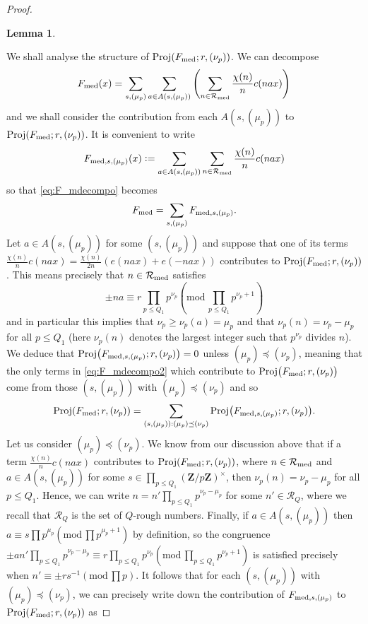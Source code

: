 \documentclass[11pt, reqno]{amsart}
\newtheorem{lemma}[theorem]{Lemma}
\newcommand{\md}[1]{\ensuremath{(\mbox{mod}\, #1)}}
\DeclareMathOperator{\Proj}{Proj}
\begin{document}
\begin{proof}
\begin{lemma}
    \end{lemma}
    We shall analyse the structure of $\Proj(F_\textnormal{med};r,(\nu_p))$. We can decompose
    \begin{equation}\label{eq:F_mdecompo}F_\textnormal{med}(x)=\sum_{s,(\mu_p)}\sum_{a\in A(s,(\mu_p))}\left(\sum_{n\in\mathcal{R}_\textnormal{med}}\frac{\chi(n)}{n}c( nax)\right)
    \end{equation}
    and we shall consider the contribution from each $A(s,(\mu_p))$ to $\Proj(F_\textnormal{med};r,(\nu_p))$. It is convenient to write
    $$F_{\textnormal{med},s,(\mu_p)}(x)\vcentcolon=\sum_{a\in A(s,(\mu_p))}\sum_{n\in \mathcal{R}_\textnormal{med}}\frac{\chi(n)}{n}c( nax)$$
    so that \eqref{eq:F_mdecompo} becomes
    \begin{equation}\label{eq:F_mdecompo2}
        F_\textnormal{med}=\sum_{s,(\mu_p)}F_{\textnormal{med},s,(\mu_p)}.
    \end{equation}
    Let $a\in A(s,(\mu_p))$ for some $(s,(\mu_p))$ and suppose that one of its terms $\frac{\chi(n)}{n}c( nax)=\frac{\chi(n)}{2n}(e(nax)+e(-nax))$ contributes to $\Proj(F_\textnormal{med};r,(\nu_p))$. This means precisely that $n\in\mathcal{R}_\textnormal{med}$ satisfies $$\pm na\equiv r\prod_{p\leqslant Q_1} p^{\nu_p}\md{\prod_{p\leqslant Q_1} p^{\nu_p+1}}$$ and in particular this implies that $\nu_p\geqslant \nu_p(a)=\mu_p$ and that $\nu_p(n)=\nu_p-\mu_p$ for all $p\leqslant Q_1$ (here $\nu_p(n)$ denotes the largest integer such that $p^{\nu_p}$ divides $n$). We deduce that $\Proj\bigl(F_{\textnormal{med},s,(\mu_p)};r,(\nu_p)\bigr)=0$ unless $(\mu_p)\preceq (\nu_p)$, meaning that the only terms in \eqref{eq:F_mdecompo2} which contribute to $\Proj\bigl(F_\textnormal{med};r,(\nu_p)\bigr)$ come from those $(s,(\mu_p))$ with $(\mu_p)\preceq (\nu_p)$ and so
    \begin{align}\label{eq:projdecompo}
        \Proj(F_\textnormal{med};r,(\nu_p))=\sum_{(s,(\mu_p)):(\mu_p)\preceq(\nu_p)}\Proj\bigl(F_{\textnormal{med},s,(\mu_p)};r,(\nu_p)\bigr).
    \end{align}
    Let us consider $(\mu_p)\preceq (\nu_p)$. We know from our discussion above that if a term $\frac{\chi(n)}{n}c( nax)$ contributes to $\Proj(F_\textnormal{med};r,(\nu_p))$, where $n\in\mathcal{R}_\textnormal{med}$ and $a\in A(s,(\mu_p))$ for some $s\in \prod_{p\leqslant Q_1}(\mathbf{Z}/p\mathbf{Z})^\times$, then $\nu_p(n)=\nu_p-\mu_p$ for all $p\leqslant Q_1$. Hence, we can write $n=n'\prod_{p\leqslant Q_1}p^{\nu_p-\mu_p}$ for some $n'\in\mathcal{R}_{Q}$, where we recall that $\mathcal{R}_Q$ is the set of $Q$-rough numbers. Finally, if $a\in A(s,(\mu_p))$ then $a\equiv s\prod p^{\mu_p}\md{\prod p^{\mu_p+1}}$ by definition, so the congruence $\pm an'\prod_{p\leqslant Q_1}p^{\nu_p-\mu_p}\equiv r\prod_{p\leqslant Q_1} p^{\nu_p}\md{\prod_{p\leqslant Q_1} p^{\nu_p+1}}$ is satisfied precisely when $n'\equiv \pm rs^{-1}\md{\prod p}$. It follows that for each $(s,(\mu_p))$ with $(\mu_p)\preceq(\nu_p)$, we can precisely write down the contribution of $F_{\textnormal{med},s,(\mu_p)}$ to $\Proj(F_\textnormal{med};r,(\nu_p))$ as

\end{proof}
\end{document}
